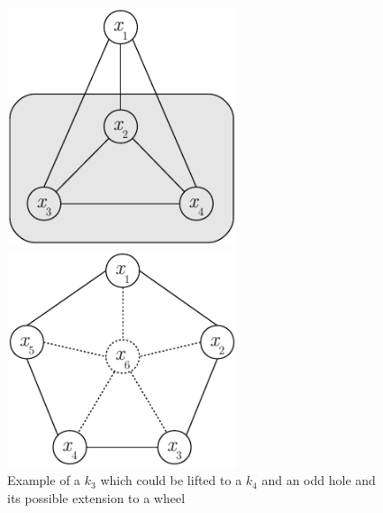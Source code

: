 \documentclass{endm}
\begin{document}
\begin{figure}	
	\begin{minipage}[h]{.5\textwidth}
		\begin{center}
			\includegraphics[width=0.6\textwidth]{clique.pdf}
		\end{center}
	\end{minipage}
	\begin{minipage}[h]{.5\textwidth}
		\begin{center}
			\includegraphics[width=0.6\textwidth]{oddHole.pdf}
		\end{center}
	\end{minipage}
	\caption{Example of a $k_{3}$ which could be lifted to a $k_{4}$    and an odd hole and its possible extension to a wheel} \label{figLiftings}
\end{figure}
\end{document}

